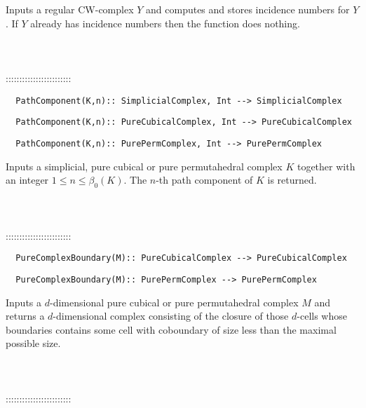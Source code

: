 \documentclass[a4paper,11pt]{report}
\begin{document}
{ 

 Inputs a regular CW-complex $Y$ and computes and stores incidence numbers for $Y$. If $Y$ already has incidence numbers then the function does nothing. \\
 \\
 \\
 \\
 ::::::::::::::::::::::::\\
 
\begin{verbatim}  PathComponent(K,n):: SimplicialComplex, Int --> SimplicialComplex
\end{verbatim}
 
\begin{verbatim}  PathComponent(K,n):: PureCubicalComplex, Int --> PureCubicalComplex
\end{verbatim}
 
\begin{verbatim}  PathComponent(K,n):: PurePermComplex, Int --> PurePermComplex
\end{verbatim}


 

Inputs a simplicial, pure cubical or pure permutahedral complex $K$ together with an integer $1 \le n \le \beta_0(K)$. The $n$-th path component of $K$ is returned. \\
 \\
 \\
 \\
 ::::::::::::::::::::::::\\
 
\begin{verbatim}  PureComplexBoundary(M):: PureCubicalComplex --> PureCubicalComplex
\end{verbatim}
 
\begin{verbatim}  PureComplexBoundary(M):: PurePermComplex --> PurePermComplex
\end{verbatim}


 

 Inputs a $d$-dimensional pure cubical or pure permutahedral complex $M$ and returns a $d$-dimensional complex consisting of the closure of those $d$-cells whose boundaries contains some cell with coboundary of size less than
the maximal possible size. \\
 \\
 \\
 \\
 ::::::::::::::::::::::::\\
 
}
\end{document}
